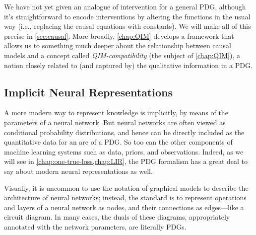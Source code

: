 We have not yet given an analogue of intervention for a general PDG, although it's straightforward to encode interventions by altering the functions in the usual way (i.e., replacing the causal equations with constants).
We will make all of this precise in \cref{sec:causal}.
More broadly, \cref{chap:QIM} develops a framework that allows us to something much deeper about the relationship between causal models and a concept called \emph{QIM-compatibility} (the subject of \cref{chap:QIM}), a notion closely related to (and captured by) the qualitative information in a PDG. 

\subsection{Implicit Neural Representations}
    \label{ssec:implicit-neural-repr}

A more modern way to represent knowledge is implicitly, by means of the parameters of a neural network. 
But neural networks are often viewed as conditional probability distributions, and hence can be directly included as the quantitative data for an arc of a PDG.
So too can the other components of machine learning systems such as data, priors, and observations. 
Indeed, as we will see in \cref{chap:one-true-loss,chap:LIR}, the PDG formalism has a great deal to say about modern neural representations as well.

Visually, it is uncommon to use the notation of graphical models to describe the architecture of neural networks; instead, the standard is to represent operations and layers of a neural network as nodes, and their connections as edges---like a circuit diagram.
In many cases, the duals of these diagrams, appropriately annotated with the network parameters, are literally PDGs.





